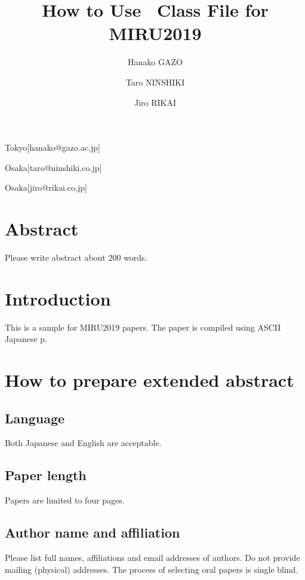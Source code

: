 \documentclass[MIRU,submit,english]{miru2019e}
\begin{document}
\title{How to Use \LaTeXe\ Class File for MIRU2019}


 \author{Hanako GAZO}{Tokyo}[hanako@gazo.ac.jp]
 \author{Taro NINSHIKI}{Osaka}[taro@ninshiki.co.jp]
 \author{Jiro RIKAI}{Osaka}[jiro@rikai.co.jp]


\maketitle

\section*{Abstract}
Please write abstract about 200 words.

\section{Introduction}
This is a sample for MIRU2019 papers.
The paper is compiled using ASCII Japanese p\LaTeXe. 

\section{How to prepare extended abstract}

\subsection{Language}

Both Japanese and English are acceptable. 

\subsection{Paper length}

Papers are limited to four pages. 

\subsection{Author name and affiliation}

Please list full names, affiliations and email addresses of authors.
Do not provide mailing (physical) addresses. 
The process of selecting oral papers is single blind.
\end{document}
